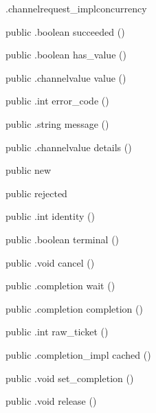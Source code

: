 \begin{CrexxClass}{.channelrequest\_impl}{concurrency}
\begin{Members}
    \Method
      {public}
      {.boolean}
      {succeeded}
      {()}

    \Method
      {public}
      {.boolean}
      {has\_value}
      {()}

    \Method
      {public}
      {.channelvalue}
      {value}
      {()}

    \Method
      {public}
      {.int}
      {error\_code}
      {()}

    \Method
      {public}
      {.string}
      {message}
      {()}

    \Method
      {public}
      {.channelvalue}
      {details}
      {()}

    \Factory
      {public}
      {new}
      {}

    \Factory
      {public}
      {rejected}
      {}

    \Method
      {public}
      {.int}
      {identity}
      {()}

    \Method
      {public}
      {.boolean}
      {terminal}
      {()}

    \Method
      {public}
      {.void}
      {cancel}
      {()}

    \Method
      {public}
      {.completion}
      {wait}
      {()}

    \Method
      {public}
      {.completion}
      {completion}
      {()}

    \Method
      {public}
      {.int}
      {raw\_ticket}
      {()}

    \Method
      {public}
      {.completion\_impl}
      {cached}
      {()}

    \Method
      {public}
      {.void}
      {set\_completion}
      {()}

    \Method
      {public}
      {.void}
      {release}
      {()}

  \end{Members}
\end{CrexxClass}

